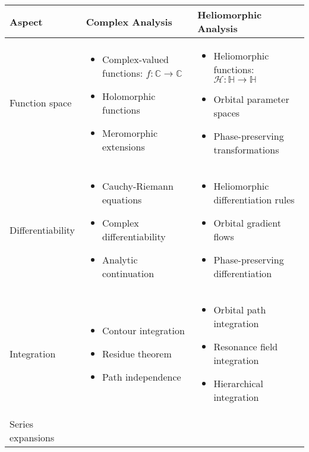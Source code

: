 \begin{center}
\begin{tabular}{|p{3cm}|p{5cm}|p{5cm}|}
\hline
\textbf{Aspect} & \textbf{Complex Analysis} & \textbf{Heliomorphic Analysis} \\
\hline
Function space & 
\begin{itemize}
    \item Complex-valued functions: $f: \mathbb{C} \to \mathbb{C}$
    \item Holomorphic functions
    \item Meromorphic extensions
\end{itemize} &
\begin{itemize}
    \item Heliomorphic functions: $\mathcal{H}: \mathbb{H} \to \mathbb{H}$
    \item Orbital parameter spaces
    \item Phase-preserving transformations
\end{itemize} \\
\hline
Differentiability & 
\begin{itemize}
    \item Cauchy-Riemann equations
    \item Complex differentiability
    \item Analytic continuation
\end{itemize} &
\begin{itemize}
    \item Heliomorphic differentiation rules
    \item Orbital gradient flows
    \item Phase-preserving differentiation
\end{itemize} \\
\hline
Integration & 
\begin{itemize}
    \item Contour integration
    \item Residue theorem
    \item Path independence
\end{itemize} &
\begin{itemize}
    \item Orbital path integration
    \item Resonance field integration
    \item Hierarchical integration
\end{itemize} \\
\hline
Series expansions & 
\begin{itemize}

\end{itemize}
\end{tabular}
\end{center}
